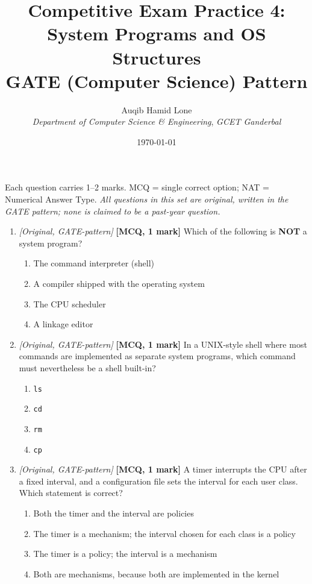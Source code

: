 \documentclass[11pt]{article}
\title{Competitive Exam Practice 4: System Programs and OS Structures\\\large GATE (Computer Science) Pattern}
\author{Auqib Hamid Lone\\[0.3em]
  \emph{Department of Computer Science \& Engineering}, \emph{GCET Ganderbal}}
\date{\today}
\begin{document}
\maketitle

\noindent Each question carries 1--2 marks. MCQ = single correct option; NAT = Numerical Answer Type. \emph{All questions in this set are original, written in the GATE pattern; none is claimed to be a past-year question.}

\begin{enumerate}
\item[\textbf{Q1}] \textit{[Original, GATE-pattern]} \textbf{[MCQ, 1 mark]} Which of the following is \textbf{NOT} a system program?
\begin{enumerate}
  \item[(A)] The command interpreter (shell)
  \item[(B)] A compiler shipped with the operating system
  \item[(C)] The CPU scheduler
  \item[(D)] A linkage editor
\end{enumerate}

\item[\textbf{Q2}] \textit{[Original, GATE-pattern]} \textbf{[MCQ, 1 mark]} In a UNIX-style shell where most commands are implemented as separate system programs, which command must nevertheless be a shell built-in?
\begin{enumerate}
  \item[(A)] \texttt{ls}
  \item[(B)] \texttt{cd}
  \item[(C)] \texttt{rm}
  \item[(D)] \texttt{cp}
\end{enumerate}

\item[\textbf{Q3}] \textit{[Original, GATE-pattern]} \textbf{[MCQ, 1 mark]} A timer interrupts the CPU after a fixed interval, and a configuration file sets the interval for each user class. Which statement is correct?
\begin{enumerate}
  \item[(A)] Both the timer and the interval are policies
  \item[(B)] The timer is a mechanism; the interval chosen for each class is a policy
  \item[(C)] The timer is a policy; the interval is a mechanism
  \item[(D)] Both are mechanisms, because both are implemented in the kernel
\end{enumerate}


\end{enumerate}
\end{document}
